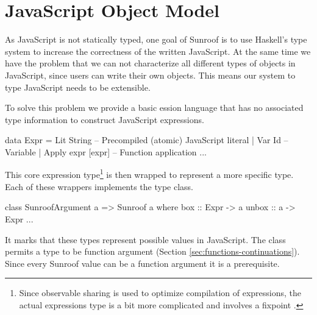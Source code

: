  
\section{JavaScript Object Model}
\label{sec:object-model}

\begin{comment}
JavaScript is object based. It provides various objects,
including numbers, booleans, maps, and others. We
provide in Sunroof about a dozen common object,
including \Src{JSObject} (the generic object type), \Src{JSNumber}
(floating point numbers), \Src{JSCanvas} (HTML5 canvas type) 
and others. A simple
casting function is provided when the type-system
needs to be overwritten. Along with each of these types,
we provide typed methods.
\begin{Code}
 jsDrawBox :: JSObject -> JS t ()
 jsDrawBox document = do
     foo <- document # getElementById("foo")
     cxt <- foo # getContext("2d")     cxt # drawRect (0,0,100,100)
\end{Code}
Here, \Src{\#} is a reverse apply, so the types
of the function in the above example are
\begin{Code}
(#) :: o -> (o -> JS t a) -> JS t a
getElementById :: JSString -> JSObject -> JS t JSContext
getContext :: JSString -> JSContext -> JS t JSCanvas
drawRect :: (JSNumber,JSNumber,JSNumber,JSNumber) -> JSCanvas -> JS t ()
\end{Code}        
From experience, even though we are targeting
an untyped language, the type system gets in the
way less than we expected.
\end{comment}

As JavaScript is not statically typed, one goal
of Sunroof is to use Haskell's type system to
increase the correctness of the written JavaScript.
At the same time we have the problem that we can not characterize 
all different types of objects in JavaScript, since 
users can write their own objects. This means our 
system to type JavaScript needs to be extensible.

To solve this problem we provide a basic ession 
language that has no associated type information to construct 
JavaScript expressions.
\begin{Code}
data Expr 
  = Lit String -- Precompiled (atomic) JavaScript literal
  | Var Id     -- Variable
  | Apply expr [expr]    -- Function application
  ...
\end{Code}
This core expression type\footnote{
Since observable sharing  is used to optimize compilation
of expressions, the actual expressions type is a bit more 
complicated and involves a fixpoint .} 
is then wrapped to represent a more specific 
type. Each of these wrappers implements the  type 
class.
\begin{Code}
class SunroofArgument a => Sunroof a where
  box :: Expr -> a
  unbox :: a -> Expr
  ...
\end{Code}
It marks that these types represent possible values in JavaScript.
The  class permits a type 
to be function argument (Section \ref{sec:functions-continuations}).
Since every Sunroof value can be a function argument it is a 
prerequisite.

